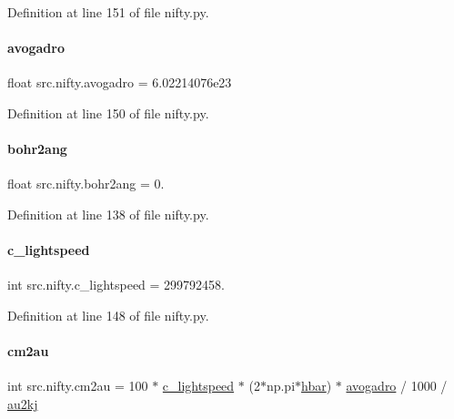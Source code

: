 Definition at line 151 of file nifty.\+py.

\mbox{\label{namespacesrc_1_1nifty_aeed1993b103b65e612e37fcdf66792d5}} 
\paragraph{\texorpdfstring{avogadro}{avogadro}}
{\footnotesize\ttfamily float src.\+nifty.\+avogadro = 6.\+02214076e23}



Definition at line 150 of file nifty.\+py.

\mbox{\label{namespacesrc_1_1nifty_a4ce0e3b582ee58a4286a88bd46202002}} 
\paragraph{\texorpdfstring{bohr2ang}{bohr2ang}}
{\footnotesize\ttfamily float src.\+nifty.\+bohr2ang = 0.}



Definition at line 138 of file nifty.\+py.

\mbox{\label{namespacesrc_1_1nifty_a4acb2716dbb7ad1ccb96effa0328861c}} 
\paragraph{\texorpdfstring{c\+\_\+lightspeed}{c\_lightspeed}}
{\footnotesize\ttfamily int src.\+nifty.\+c\+\_\+lightspeed = 299792458.}



Definition at line 148 of file nifty.\+py.

\mbox{\label{namespacesrc_1_1nifty_aefe681cba38c0f4df83e94f291942fec}} 
\paragraph{\texorpdfstring{cm2au}{cm2au}}
{\footnotesize\ttfamily int src.\+nifty.\+cm2au = 100 $\ast$ \hyperlink{namespacesrc_1_1nifty_a4acb2716dbb7ad1ccb96effa0328861c}{c\+\_\+lightspeed} $\ast$ (2$\ast$np.\+pi$\ast$\hyperlink{namespacesrc_1_1nifty_a3af7eb6b25ba3460807326b4a542c44a}{hbar}) $\ast$ \hyperlink{namespacesrc_1_1nifty_aeed1993b103b65e612e37fcdf66792d5}{avogadro} / 1000 / \hyperlink{namespacesrc_1_1nifty_af5788f33a1e5a2d91f1dba0b7dc00f3e}{au2kj}}



